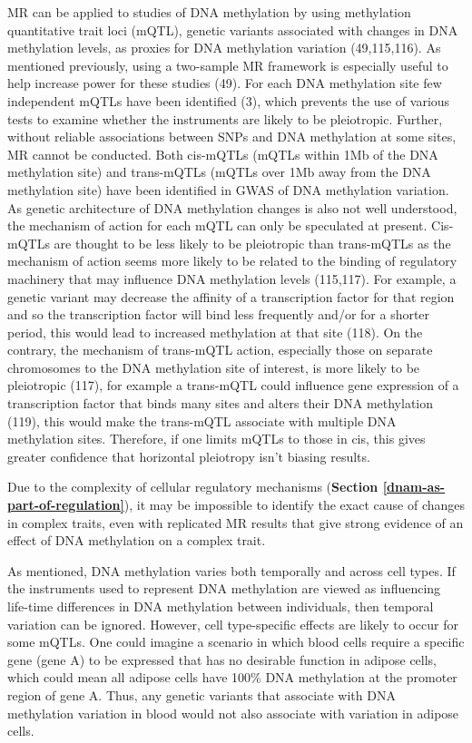 \documentclass[11pt,oneside]{bristolthesis}
\begin{document}
MR can be applied to studies of DNA methylation by using methylation quantitative trait loci (mQTL), genetic variants associated with changes in DNA methylation levels, as proxies for DNA methylation variation (49,115,116). As mentioned previously, using a two-sample MR framework is especially useful to help increase power for these studies (49). For each DNA methylation site few independent mQTLs have been identified (3), which prevents the use of various tests to examine whether the instruments are likely to be pleiotropic. Further, without reliable associations between SNPs and DNA methylation at some sites, MR cannot be conducted. Both cis-mQTLs (mQTLs within 1Mb of the DNA methylation site) and trans-mQTLs (mQTLs over 1Mb away from the DNA methylation site) have been identified in GWAS of DNA methylation variation. As genetic architecture of DNA methylation changes is also not well understood, the mechanism of action for each mQTL can only be speculated at present. Cis-mQTLs are thought to be less likely to be pleiotropic than trans-mQTLs as the mechanism of action seems more likely to be related to the binding of regulatory machinery that may influence DNA methylation levels (115,117). For example, a genetic variant may decrease the affinity of a transcription factor for that region and so the transcription factor will bind less frequently and/or for a shorter period, this would lead to increased methylation at that site (118). On the contrary, the mechanism of trans-mQTL action, especially those on separate chromosomes to the DNA methylation site of interest, is more likely to be pleiotropic (117), for example a trans-mQTL could influence gene expression of a transcription factor that binds many sites and alters their DNA methylation (119), this would make the trans-mQTL associate with multiple DNA methylation sites. Therefore, if one limits mQTLs to those in cis, this gives greater confidence that horizontal pleiotropy isn't biasing results.

Due to the complexity of cellular regulatory mechanisms (\textbf{Section \ref{dnam-as-part-of-regulation}}), it may be impossible to identify the exact cause of changes in complex traits, even with replicated MR results that give strong evidence of an effect of DNA methylation on a complex trait.

As mentioned, DNA methylation varies both temporally and across cell types. If the instruments used to represent DNA methylation are viewed as influencing life-time differences in DNA methylation between individuals, then temporal variation can be ignored. However, cell type-specific effects are likely to occur for some mQTLs. One could imagine a scenario in which blood cells require a specific gene (gene A) to be expressed that has no desirable function in adipose cells, which could mean all adipose cells have 100\% DNA methylation at the promoter region of gene A. Thus, any genetic variants that associate with DNA methylation variation in blood would not also associate with variation in adipose cells.
\end{document}
